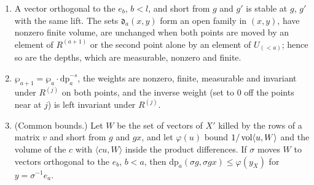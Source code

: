 \begin{lemma}\label{lem:stable}
\begin{enumerate}[label=\textup{(\alph*)}]
\item A vector orthogonal to the $e_b$, $b<l$, and short from $g$ and $g'$ is stable at $g$, $g'$ with the same lift. The sets $\mathfrak d_a(x,y)$ form an open family in $(x,y)$, have nonzero finite volume, are unchanged when both points
are moved by an element of $R^{(a+1)}$ or the second point alone by an element of $U_{(<a)}$; hence so are the depths, which are measurable, nonzero and finite.
\item $\wp_{a+1}=\wp_a\cdot\mathrm{dp}_a^{-s}$, the weights are nonzero, finite, measurable and invariant under $R^{(j)}$ on both points, and the inverse weight (set to $0$ off the points near at $j$) is left invariant under $R^{(j)}$.
\item (Common bounds.) Let $W$ be the set of vectors of $X'$ killed by the rows of a matrix $v$ and short from $g$ and $gx$, and let $\varphi(u)$ bound $1/\operatorname{vol}\langle u,W\rangle$ and the volume of the $c$ with $\langle cu,W\rangle$ inside the
product differences. If $\sigma$ moves $W$ to vectors orthogonal to the $e_b$, $b<a$, then $\mathrm{dp}_a(\sigma g,\sigma gx)\le\varphi(y_X)$ for $y=\sigma^{-1}e_a$.
\end{enumerate}
\end{lemma}

